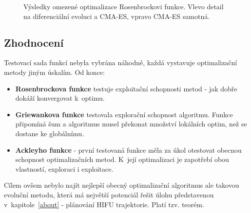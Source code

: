 \begin{figure}[H]
    \caption{Výsledky omezené optimalizace Rosenbrockovi funkce. Vlevo detail na diferenciální evoluci a CMA-ES, vpravo CMA-ES samotná.}
    \label{fg:bench:rosen:detail}
\end{figure}

\subsection{Zhodnocení}
Testovací sada funkcí nebyla vybrána náhodně, každá vystavuje optimalizační metody jiným úskalím. Od konce: 
\begin{itemize}
    \item \textbf{Rosenbrockova funkce} testuje exploitační schopnosti metod - jak dobře dokáží konvergovat k~optimu.
    \item \textbf{Griewankova funkce} testovala explorační schopnost algoritmu. Funkce připomíná šum a algoritmus musel překonat množství lokálních optim, než se dostane ke globálnímu.
    \item \textbf{Ackleyho funkce} - první testovaná funkce měla za úkol otestovat obecnou schopnost optimalizačních metod. K~její optimalizaci je zapotřebí obou vlastností, exploraci i exploitace.
\end{itemize}
Cílem ovšem nebylo najít nejlepší obecný optimalizační algoritmus ale takovou evoluční metodu, která má největší potenciál řešit úlohu představenou v~kapitole~\ref{about} - plánování HIFU trajektorie. Platí tzv.  teorém. 

